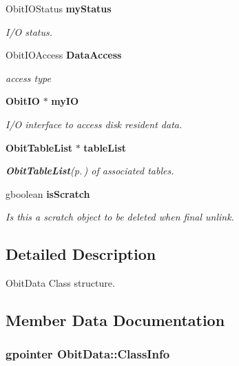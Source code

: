 \begin{CompactItemize}
Obit\-IOStatus {\bf my\-Status}
\begin{CompactList}\small\item\em I/O status. \item\end{CompactList}\item 
Obit\-IOAccess {\bf Data\-Access}
\begin{CompactList}\small\item\em access type \item\end{CompactList}\item 
{\bf Obit\-IO} $\ast$ {\bf my\-IO}
\begin{CompactList}\small\item\em I/O interface to access disk resident data. \item\end{CompactList}\item 
{\bf Obit\-Table\-List} $\ast$ {\bf table\-List}
\begin{CompactList}\small\item\em {\bf Obit\-Table\-List}{\rm (p.\,\pageref{structObitTableList})} of associated tables. \item\end{CompactList}\item 
gboolean {\bf is\-Scratch}
\begin{CompactList}\small\item\em Is this a scratch object to be deleted when final unlink. \item\end{CompactList}\end{CompactItemize}


\subsection{Detailed Description}
Obit\-Data Class structure. 



\subsection{Member Data Documentation}
\subsubsection{\setlength{\rightskip}{0pt plus 5cm}gpointer {\bf Obit\-Data::Class\-Info}}\label{structObitData_o1}


